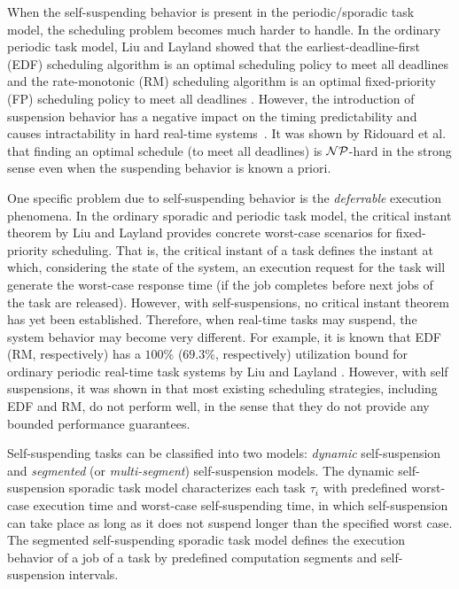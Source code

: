 
When the self-suspending behavior is present in the periodic/sporadic task model, the scheduling problem becomes much harder to handle. In the ordinary periodic task model, Liu and Layland showed that the earliest-deadline-first (EDF) scheduling algorithm is an optimal scheduling policy to meet all deadlines and the rate-monotonic (RM) scheduling algorithm is an optimal fixed-priority (FP) scheduling policy to meet all deadlines \cite{Liu_1973}. However, the introduction of suspension behavior has a negative impact on the timing predictability and causes intractability in hard real-time systems~\cite{Ridouard_2004}. It was shown by Ridouard et al. \cite{Ridouard_2004} that finding an optimal schedule (to meet all deadlines) is ${\cal NP}$-hard in the strong sense even when the suspending behavior is known a priori.


One specific problem due to self-suspending behavior is the \emph{deferrable} execution phenomena. In the ordinary sporadic and periodic task model, the critical instant theorem by Liu and Layland \cite{Liu_1973} provides concrete worst-case scenarios for fixed-priority scheduling.  That is, the critical instant of a task defines the instant at which, considering the state of the system, an execution request for the task will generate the worst-case response time (if the job completes before next jobs of the task are released).
However, with self-suspensions, no critical instant theorem has yet been established.
Therefore, when real-time tasks may suspend, the system behavior may become very different. For example, it is known that EDF (RM, respectively) has a $100\%$ ($69.3\%$, respectively) utilization bound for ordinary periodic real-time task systems by Liu and Layland \cite{Liu_1973}. However, with self suspensions,  it was shown in \cite{Ridouard_2004,RTSS-ChenL14} that most existing scheduling strategies, including EDF and RM, do not perform well, in the sense that they do not provide any bounded performance guarantees. 

Self-suspending tasks can be classified into two models: \emph{dynamic} self-suspension and \emph{segmented} (or \emph{multi-segment}) self-suspension models.
The dynamic self-suspension sporadic task model characterizes each
task $\tau_i$ with predefined worst-case execution time and worst-case self-suspending time, in which self-suspension can take place as long as it does not suspend longer than the specified worst case. The segmented self-suspending sporadic task model defines the execution behavior of a job of a task by predefined computation segments and self-suspension intervals.  

